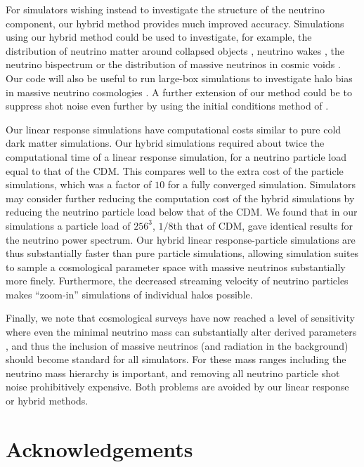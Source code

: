 \documentclass[useAMS, usenatbib]{mnras}
\begin{document}
For simulators wishing instead to investigate the structure of the neutrino component, our hybrid method provides much improved accuracy. Simulations using our hybrid method could be used to investigate, for example, the distribution of neutrino matter around collapsed objects \citep{FVN_2013}, neutrino wakes \citep{Inman_2015}, the neutrino bispectrum \citep{Furhrer_2015, Ruggeri_18} or the distribution of massive neutrinos in cosmic voids \citep{Banerjee_2016}. Our code will also be useful to run large-box simulations to investigate halo bias in massive neutrino cosmologies \citep{Loverde_14, Chiang_17}. A further extension of our method could be to suppress shot noise even further by using the initial conditions method of \cite{Banerjee_2018}.

Our linear response simulations have computational costs similar to pure cold dark matter simulations. Our hybrid simulations required about twice the computational time of a linear response simulation, for a neutrino particle load equal to that of the CDM. This compares well to the extra cost of the particle simulations, which was a factor of $10$ for a fully converged simulation. Simulators may consider further reducing the computation cost of the hybrid simulations by reducing the neutrino particle load below that of the CDM. We found that in our simulations a particle load of $256^3$, $1/8$th that of CDM, gave identical results for the neutrino power spectrum. Our hybrid linear response-particle simulations are thus substantially faster than pure particle simulations, allowing simulation suites to sample a cosmological parameter space with massive neutrinos substantially more finely. Furthermore, the decreased streaming velocity of neutrino particles makes ``zoom-in'' simulations of individual halos possible.

Finally, we note that cosmological surveys have now reached a level of sensitivity where even the minimal neutrino mass can substantially alter derived parameters \citep{Calabrese_2017}, and thus the inclusion of massive neutrinos (and radiation in the background) should become standard for all simulators. For these mass ranges including the neutrino mass hierarchy is important, and removing all neutrino particle shot noise prohibitively expensive. Both problems are avoided by our linear response or hybrid methods.


\section*{Acknowledgements}
\end{document}
